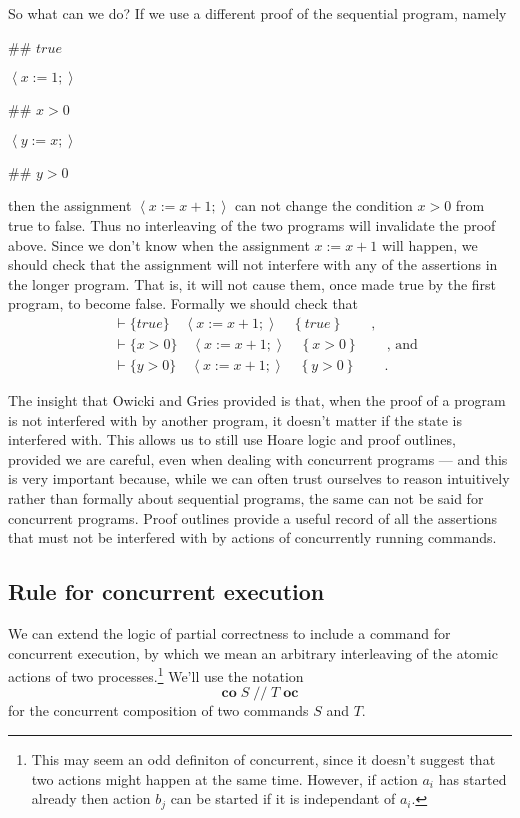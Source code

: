 \documentclass[muchmore,11pt]{article}%
\begin{document}
So what can we do? If we use a different proof of the sequential program, namely

\begin{code}
\#\# $\mathit{true}$

$\left\langle x:=1;\right\rangle $

\#\# $x>0$

$\left\langle y:=x;\right\rangle $

\#\# $y>0$
\end{code}

\noindent then the assignment $\left\langle x:=x+1;\right\rangle $ can not
change the condition $x>0$ from true to false. Thus no interleaving of the two
programs will invalidate the proof above. Since we don't know when the
assignment $x:=x+1$ will happen, we should check that the assignment will not
interfere with any of the assertions in the longer program. That is, it will
not cause them, once made true by the first program, to become false. Formally
we should check that%
\begin{align*}
&  \vdash\{\mathit{true}\}\quad\left\langle x:=x+1;\right\rangle \quad\left\{
\mathit{true}\right\}  \qquad\text{,}\\
&  \vdash\{x>0\}\quad\left\langle x:=x+1;\right\rangle \quad\left\{
x>0\right\}  \qquad\text{, and}\\
&  \vdash\{y>0\}\quad\left\langle x:=x+1;\right\rangle \quad\left\{
y>0\right\}  \qquad.
\end{align*}


The insight that Owicki and Gries provided is that, when the proof of a
program is not interfered with by another program, it doesn't matter if the
state is interfered with. This allows us to still use Hoare logic and proof
outlines, provided we are careful, even when dealing with concurrent programs
--- and this is very important because, while we can often trust ourselves to
reason intuitively rather than formally about sequential programs, the same
can not be said for concurrent programs. Proof outlines provide a useful
record of all the assertions that must not be interfered with by actions of
concurrently running commands.

\subsection{Rule for concurrent execution}

We can extend the logic of partial correctness to include a command for
concurrent execution, by which we mean an arbitrary interleaving of the atomic
actions of two processes.\footnote{This may seem an odd definiton of
concurrent, since it doesn't suggest that two actions might happen at the same
time. However, if action $a_{i}$ has started already then action $b_{j}$ can
be started if it is independant of $a_{i}$.} We'll use the notation%
\[
\mathbf{co}\;S\;//\;T\;\mathbf{oc}%
\]
for the concurrent composition of two commands $S$ and $T$.
\end{document}
